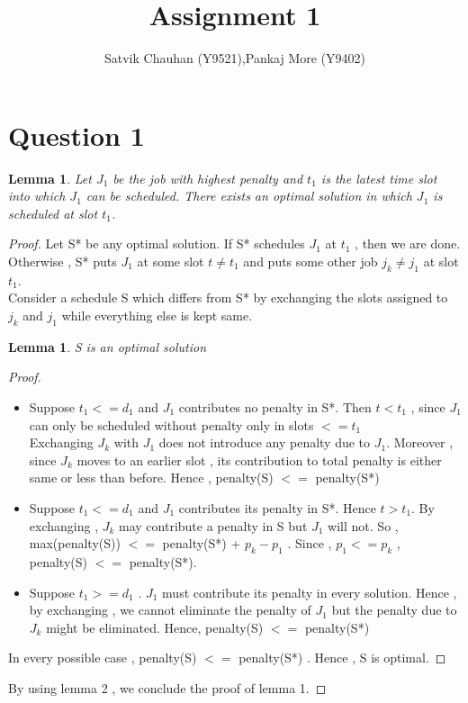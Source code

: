 \documentclass[11pt]{article}
\title{Assignment 1}
\author{Satvik Chauhan (Y9521),Pankaj More (Y9402)}
\newtheorem{lemma}[theorem]{Lemma}
\begin{document}
\maketitle
\section*{Question 1}
\begin{lemma}
Let $J_{1}$ be the job with highest penalty and $t_{1}$ is the latest time slot into which $J_{1}$ can be scheduled.
There exists an optimal solution in which $J_{1}$ is scheduled at slot $t_{1}$.
\end{lemma}
\begin{proof}
Let S* be any optimal solution. If S* schedules $J_{1}$ at $t_1$ , then we are done.\\
Otherwise , S* puts $J_1$ at some slot $t \neq t_1$ and puts some other job $j_k \neq j_1$ at slot $t_1$. \\
Consider a schedule S which differs from S* by exchanging the slots assigned to $j_k$ and $j_1$ while everything else is kept same. 
\begin{lemma}
S is an optimal solution
\end{lemma}
\begin{proof}
\begin{itemize}
\item Suppose $t_1 <= d_1$ and $J_1$ contributes no penalty in S*. Then $t < t_1$ , since $J_1$ can only be scheduled without penalty only in slots $<= t_1$ \\
Exchanging $J_k$ with $J_1$ does not introduce any penalty due to $J_1$.
Moreover , since $J_k$ moves to an earlier slot , its contribution to total penalty is either same or less than before. Hence , penalty(S) $<=$ penalty(S*)
\item Suppose $t_1 <= d_1$ and $J_1$ contributes its penalty in S*. Hence $t > t_1$. By exchanging , $J_k$ may contribute a penalty in S but $J_1$ will not. So , max(penalty(S)) $<=$ penalty(S*) + $p_k - p_1$ . Since , $p_1 <= p_k$ , penalty(S) $<=$ penalty(S*). 
\item Suppose $t_1 >= d_1$ . $J_1$ must contribute its penalty in every solution. Hence , by exchanging , we cannot eliminate the penalty of $J_1$ but the penalty due to $J_k$ might be eliminated.
Hence, penalty(S) $<=$ penalty(S*) 
\end{itemize}
In every possible case , penalty(S) $<=$ penalty(S*) . Hence , S is optimal.
\end{proof}
By using lemma 2 , we conclude the proof of lemma 1.
\end{proof}
\end{document}
